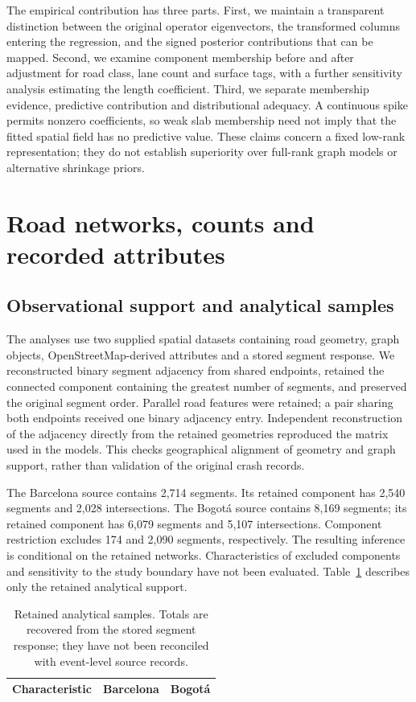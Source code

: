 \documentclass[11pt]{article}
\begin{document}
The empirical contribution has three parts. First, we maintain a transparent distinction between the original operator eigenvectors, the transformed columns entering the regression, and the signed posterior contributions that can be mapped. Second, we examine component membership before and after adjustment for road class, lane count and surface tags, with a further sensitivity analysis estimating the length coefficient. Third, we separate membership evidence, predictive contribution and distributional adequacy. A continuous spike permits nonzero coefficients, so weak slab membership need not imply that the fitted spatial field has no predictive value. These claims concern a fixed low-rank representation; they do not establish superiority over full-rank graph models or alternative shrinkage priors.

\section{Road networks, counts and recorded attributes}
\subsection{Observational support and analytical samples}
The analyses use two supplied spatial datasets containing road geometry, graph objects, OpenStreetMap-derived attributes and a stored segment response. We reconstructed binary segment adjacency from shared endpoints, retained the connected component containing the greatest number of segments, and preserved the original segment order. Parallel road features were retained; a pair sharing both endpoints received one binary adjacency entry. Independent reconstruction of the adjacency directly from the retained geometries reproduced the matrix used in the models. This checks geographical alignment of geometry and graph support, rather than validation of the original crash records.

The Barcelona source contains 2,714 segments. Its retained component has 2,540 segments and 2,028 intersections. The Bogot\'a source contains 8,169 segments; its retained component has 6,079 segments and 5,107 intersections. Component restriction excludes 174 and 2,090 segments, respectively. The resulting inference is conditional on the retained networks. Characteristics of excluded components and sensitivity to the study boundary have not been evaluated. Table~\ref{tab:data} describes only the retained analytical support.

\begin{table}[tb]
\centering\small
\caption{Retained analytical samples. Totals are recovered from the stored segment response; they have not been reconciled with event-level source records.}
\label{tab:data}
\begin{tabular}{lrr}\toprule
Characteristic & Barcelona & Bogot\'a\\\midrule
\end{tabular}
\end{table}
\end{document}
